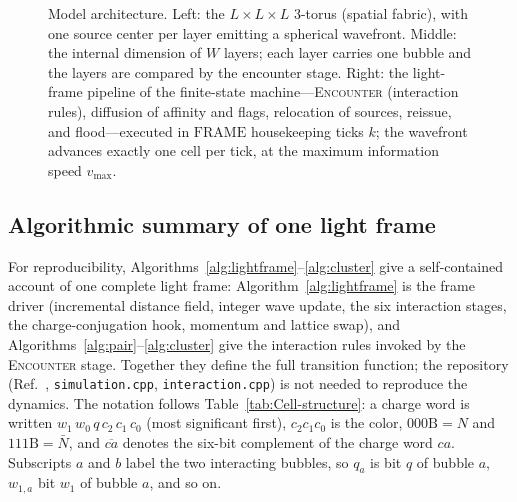 \documentclass[a4paper]{article}
\begin{document}
\begin{figure}[ht]
\caption{Model architecture. \label{fig:architecture} Left: the $L\times L\times L$ 3-torus (spatial fabric), with one source center per layer emitting a spherical wavefront.  Middle: the internal dimension of $W$ layers; each layer carries one bubble and the layers are compared by the encounter stage.  Right: the light-frame pipeline of the finite-state machine---\textsc{Encounter} (interaction rules), diffusion of affinity and flags, relocation of sources, reissue, and flood---executed in $\mathrm{FRAME}$ housekeeping ticks $k$; the wavefront advances exactly one cell per tick, at the maximum information speed $v_{\max}$.}
\end{figure}
\subsection{Algorithmic summary of one light frame}\label{subsec:algorithm}
For reproducibility, Algorithms~\ref{alg:lightframe}--\ref{alg:cluster} give a self-contained account of one complete light frame: Algorithm~\ref{alg:lightframe} is the frame driver (incremental distance field, integer wave update, the six interaction stages, the charge-conjugation hook, momentum and lattice swap), and Algorithms~\ref{alg:pair}--\ref{alg:cluster} give the interaction rules invoked by the \textsc{Encounter} stage.  Together they define the full transition function; the repository (Ref.~\cite{af_neto}, \texttt{simulation.cpp}, \texttt{interaction.cpp}) is not needed to reproduce the dynamics.  The notation follows Table~\ref{tab:Cell-structure}: a charge word is written $w_{1}\,w_{0}\,q\,c_{2}\,c_{1}\,c_{0}$ (most significant first), $c_{2}c_{1}c_{0}$ is the color, $000\mathrm{B}=N$ and $111\mathrm{B}=\bar{N}$, and $\overline{ca}$ denotes the six-bit complement of the charge word $ca$.  Subscripts $a$ and $b$ label the two interacting bubbles, so $q_a$ is bit $q$ of bubble $a$, $w_{1,a}$ bit $w_{1}$ of bubble $a$, and so on.
\end{document}
